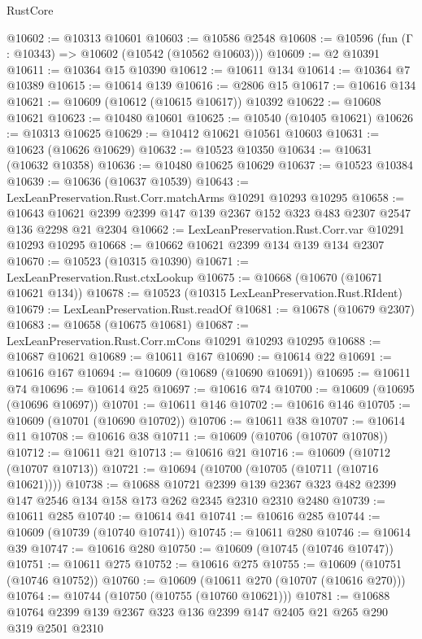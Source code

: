 \begin{lexlean}{RustCore}
\begin{coremodule}
@10602 := @10313 @10601
@10603 := @10586 @2548
@10608 := @10596 (fun (Γ : @10343) => @10602 (@10542 (@10562 @10603)))
@10609 := @2 @10391
@10611 := @10364 @15 @10390
@10612 := @10611 @134
@10614 := @10364 @7 @10389
@10615 := @10614 @139
@10616 := @2806 @15
@10617 := @10616 @134
@10621 := @10609 (@10612 (@10615 @10617)) @10392
@10622 := @10608 @10621
@10623 := @10480 @10601
@10625 := @10540 (@10405 @10621)
@10626 := @10313 @10625
@10629 := @10412 @10621 @10561 @10603
@10631 := @10623 (@10626 @10629)
@10632 := @10523 @10350
@10634 := @10631 (@10632 @10358)
@10636 := @10480 @10625 @10629
@10637 := @10523 @10384
@10639 := @10636 (@10637 @10539)
@10643 := LexLeanPreservation.Rust.Corr.matchArms @10291 @10293 @10295
@10658 := @10643 @10621 @2399 @2399 @147 @139 @2367 @152 @323 @483 @2307 @2547 @136 @2298 @21 @2304
@10662 := LexLeanPreservation.Rust.Corr.var @10291 @10293 @10295
@10668 := @10662 @10621 @2399 @134 @139 @134 @2307
@10670 := @10523 (@10315 @10390)
@10671 := LexLeanPreservation.Rust.ctxLookup
@10675 := @10668 (@10670 (@10671 @10621 @134))
@10678 := @10523 (@10315 LexLeanPreservation.Rust.RIdent)
@10679 := LexLeanPreservation.Rust.readOf
@10681 := @10678 (@10679 @2307)
@10683 := @10658 (@10675 @10681)
@10687 := LexLeanPreservation.Rust.Corr.mCons @10291 @10293 @10295
@10688 := @10687 @10621
@10689 := @10611 @167
@10690 := @10614 @22
@10691 := @10616 @167
@10694 := @10609 (@10689 (@10690 @10691))
@10695 := @10611 @74
@10696 := @10614 @25
@10697 := @10616 @74
@10700 := @10609 (@10695 (@10696 @10697))
@10701 := @10611 @146
@10702 := @10616 @146
@10705 := @10609 (@10701 (@10690 @10702))
@10706 := @10611 @38
@10707 := @10614 @11
@10708 := @10616 @38
@10711 := @10609 (@10706 (@10707 @10708))
@10712 := @10611 @21
@10713 := @10616 @21
@10716 := @10609 (@10712 (@10707 @10713))
@10721 := @10694 (@10700 (@10705 (@10711 (@10716 @10621))))
@10738 := @10688
    @10721
    @2399
    @139
    @2367
    @323
    @482
    @2399
    @147
    @2546
    @134
    @158
    @173
    @262
    @2345
    @2310
    @2310
    @2480
@10739 := @10611 @285
@10740 := @10614 @41
@10741 := @10616 @285
@10744 := @10609 (@10739 (@10740 @10741))
@10745 := @10611 @280
@10746 := @10614 @39
@10747 := @10616 @280
@10750 := @10609 (@10745 (@10746 @10747))
@10751 := @10611 @275
@10752 := @10616 @275
@10755 := @10609 (@10751 (@10746 @10752))
@10760 := @10609 (@10611 @270 (@10707 (@10616 @270)))
@10764 := @10744 (@10750 (@10755 (@10760 @10621)))
@10781 := @10688
    @10764
    @2399
    @139
    @2367
    @323
    @136
    @2399
    @147
    @2405
    @21
    @265
    @290
    @319
    @2501
    @2310

\end{coremodule}
\end{lexlean}
